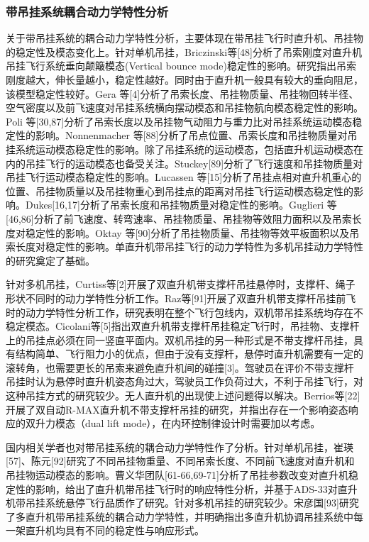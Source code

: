 \subsubsection{带吊挂系统耦合动力学特性分析}
关于带吊挂系统的耦合动力学特性分析，主要体现在带吊挂飞行时直升机、吊挂物的稳定性及模态变化上。针对单机吊挂，Briczinski等[48]分析了吊索刚度对直升机吊挂飞行系统垂向颠簸模态(Vertical bounce mode)稳定性的影响。研究指出吊索刚度越大，伸长量越小，稳定性越好。同时由于直升机一般具有较大的垂向阻尼，该模型稳定性较好。Gera 等[4]分析了吊索长度、吊挂物质量、吊挂物回转半径、空气密度以及前飞速度对吊挂系统横向摆动模态和吊挂物航向模态稳定性的影响。Poli 等[30,87]分析了吊索长度以及吊挂物气动阻力与重力比对吊挂系统运动模态稳定性的影响。Nonnenmacher 等[88]分析了吊点位置、吊索长度和吊挂物质量对吊挂系统运动模态稳定性的影响。除了吊挂系统的运动模态，包括直升机运动模态在内的吊挂飞行的运动模态也备受关注。Stuckey[89]分析了飞行速度和吊挂物质量对吊挂飞行运动模态稳定性的影响。Lucassen 等[15]分析了吊挂点相对直升机重心的位置、吊挂物质量以及吊挂物重心到吊挂点的距离对吊挂飞行运动模态稳定性的影响。Dukes[16,17]分析了吊索长度和吊挂物质量对稳定性的影响。Guglieri 等[46,86]分析了前飞速度、转弯速率、吊挂物质量、吊挂物等效阻力面积以及吊索长度对稳定性的影响。Oktay 等[90]分析了吊挂物质量、吊挂物等效平板面积以及吊索长度对稳定性的影响。单直升机带吊挂飞行的动力学特性为多机吊挂动力学特性的研究奠定了基础。

针对多机吊挂，Curtiss等[2]开展了双直升机带支撑杆吊挂悬停时，支撑杆、绳子形状不同时的动力学特性分析工作。Raz等[91]开展了双直升机带支撑杆吊挂前飞时的动力学特性分析工作，研究表明在整个飞行包线内，双机带吊挂系统均存在不稳定模态。Cicolani等[5]指出双直升机带支撑杆吊挂稳定飞行时，吊挂物、支撑杆上的吊挂点必须在同一竖直平面内。双机吊挂的另一种形式是不带支撑杆吊挂，具有结构简单、飞行阻力小的优点，但由于没有支撑杆，悬停时直升机需要有一定的滚转角，也需要更长的吊索来避免直升机间的碰撞[3]。驾驶员在评价不带支撑杆吊挂时认为悬停时直升机姿态角过大，驾驶员工作负荷过大，不利于吊挂飞行，对这种吊挂方式的研究较少。无人直升机的出现使上述问题得以解决。Berrios等[22]开展了双自动R-MAX直升机不带支撑杆吊挂的研究，并指出存在一个影响姿态响应的双升力模态（dual lift mode），在内环控制律设计时需要加以考虑。 

国内相关学者也对带吊挂系统的耦合动力学特性作了分析。针对单机吊挂，崔瑛[57]、陈元[92]研究了不同吊挂物重量、不同吊索长度、不同前飞速度对直升机和吊挂物运动模态的影响。曹义华团队[61-66,69-71]分析了吊挂参数改变对直升机稳定性的影响，给出了直升机带吊挂飞行时的响应特性分析，并基于ADS-33对直升机带吊挂系统悬停飞行品质作了研究。针对多机吊挂的研究较少。宋彦国[93]研究了多直升机带吊挂系统的耦合动力学特性，并明确指出多直升机协调吊挂系统中每一架直升机均具有不同的稳定性与响应形式。

